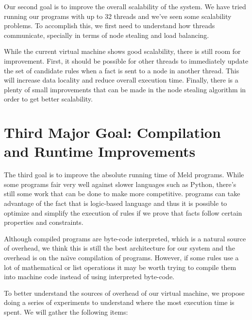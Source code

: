 Our second goal is to improve the overall scalability of the system. We have tried running our programs with up to 32 threads and we've seen
some scalability problems. To accomplish this, we first need to understand how
threads communicate, specially in terms of node stealing and load balancing.

While the current virtual machine shows good scalability, there is still room for improvement. First,
it should be possible for other threads to immediately update the set of candidate rules when a fact
is sent to a node in another thread. This will increase data locality and reduce overall execution time.
Finally, there is a plenty of small improvements that can be made in the node stealing algorithm in order to
get better scalability.

\section{Third Major Goal: Compilation and Runtime Improvements}

The third goal is to improve the absolute running time of Meld programs. While some programs fair very well against slower languages such as Python,
there's still some work that can be done to make \lang more competitive. \lang programs can take advantage of the fact that
\lang is logic-based language and thus it is possible to optimize and simplify the execution of rules
if we prove that facts follow certain properties and constraints.

Although compiled \lang programs are byte-code interpreted, which is a natural
source of overhead, we think this is still the best architecture for our system and the overhead
is on the na\"{\i}ve compilation of programs. However, 
if some rules use a lot of mathematical or list operations it may be worth trying to compile them into machine code instead of using interpreted byte-code.

To better understand the sources of overhead of our virtual machine, we propose doing a series
of experiments to understand where the most execution time is spent. We will gather the following
items:

